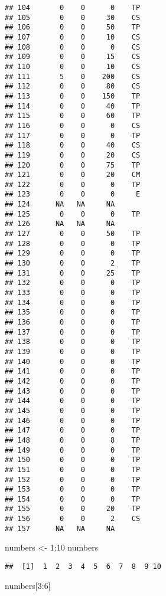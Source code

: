 \documentclass[
]{article}
\newenvironment{Shaded}{\begin{snugshade}}{\end{snugshade}}
\newcommand{\DecValTok}[1]{\textcolor[rgb]{0.00,0.00,0.81}{#1}}
\newcommand{\NormalTok}[1]{#1}
\newcommand{\OtherTok}[1]{\textcolor[rgb]{0.56,0.35,0.01}{#1}}
\newcommand{\SpecialCharTok}[1]{\textcolor[rgb]{0.00,0.00,0.00}{#1}}
\begin{document}
\begin{verbatim}
## 104       0    0      0    TP
## 105       0    0     30    CS
## 106       0    0     50    TP
## 107       0    0     10    CS
## 108       0    0      0    CS
## 109       0    0     15    CS
## 110       0    0     10    CS
## 111       5    0    200    CS
## 112       0    0     80    CS
## 113       0    0    150    TP
## 114       0    0     40    TP
## 115       0    0     60    TP
## 116       0    0      0    CS
## 117       0    0      0    TP
## 118       0    0     40    CS
## 119       0    0     20    CS
## 120       0    0     75    TP
## 121       0    0     20    CM
## 122       0    0      0    TP
## 123       0    0      0     E
## 124      NA   NA     NA      
## 125       0    0      0    TP
## 126      NA   NA     NA      
## 127       0    0     50    TP
## 128       0    0      0    TP
## 129       0    0      0    TP
## 130       0    0      2    TP
## 131       0    0     25    TP
## 132       0    0      0    TP
## 133       0    0      0    TP
## 134       0    0      0    TP
## 135       0    0      0    TP
## 136       0    0      0    TP
## 137       0    0      0    TP
## 138       0    0      0    TP
## 139       0    0      0    TP
## 140       0    0      0    TP
## 141       0    0      0    TP
## 142       0    0      0    TP
## 143       0    0      0    TP
## 144       0    0      0    TP
## 145       0    0      0    TP
## 146       0    0      0    TP
## 147       0    0      0    TP
## 148       0    0      8    TP
## 149       0    0      0    TP
## 150       0    0      0    TP
## 151       0    0      0    TP
## 152       0    0      0    TP
## 153       0    0      0    TP
## 154       0    0      0    TP
## 155       0    0     20    TP
## 156       0    0      2    CS
## 157      NA   NA     NA
\end{verbatim}

\begin{Shaded}
\begin{Highlighting}[]
\NormalTok{numbers }\OtherTok{\textless{}{-}} \DecValTok{1}\SpecialCharTok{:}\DecValTok{10}
\NormalTok{numbers}
\end{Highlighting}
\end{Shaded}

\begin{verbatim}
##  [1]  1  2  3  4  5  6  7  8  9 10
\end{verbatim}

\begin{Shaded}
\begin{Highlighting}[]
\NormalTok{numbers[}\DecValTok{3}\SpecialCharTok{:}\DecValTok{6}\NormalTok{]}
\end{Highlighting}
\end{Shaded}
\end{document}
